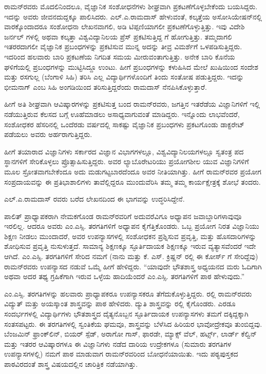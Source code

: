 ರಾಮನ್‍ರವರು ಮೊದಲಿನಿಂದಲೂ, ವೈಜ್ಞಾನಿಕ ಸಂಶೋಧನೆಗಳು ಶೀಘ್ರವಾಗಿ ಪ್ರಕಟಣೆಗೊಳ್ಳ\-ಬೇಕೆಂದು ಬಯಸಿದ್ದರು. ಇದನ್ನು ಅವರು ಜೀವನದುದ್ದಕ್ಕೂ ಪಾಲಿಸಿದರು. ಎಲ್.ಎ.ರಾಮದಾಸ್ ಹೇಳುವಂತೆ, ಕಲ್ಕತ್ತೆಯ ಅಸೋಸಿಯೇಷನ್‍ನಲ್ಲಿ ವಾರಕ್ಕೊಂದಾದರೂ ಸಂಶೋಧನಾ ಲೇಖನವಾಗಲಿ, ಅಡಿ ಟಿಪ್ಪಣಿಯಾಗಲೀ ಪ್ರಕಟಣೆಗೊಳ್ಳುತ್ತಿತ್ತು. ಇವು ವಿದೇಶಿ ಜರ್ನಲ್ ಗಳಲ್ಲಿ ಅಥವಾ ಕಲ್ಕತ್ತಾ ವಿಶ್ವವಿದ್ಯಾನಿಲಯ ಪ್ರೆಸ್ ಪ್ರಕಟಿಸುತ್ತಿದ್ದ \textit{} ಗೆ ಹೋಗುತ್ತಿತ್ತು. ತಮ್ಮದಾಗಲಿ ಇತರರದಾಗಲೀ ವೈಜ್ಞಾನಿಕ ಪ್ರಬಂಧಗಳನ್ನು ಪ್ರಕಟಿಸುವ ಮುನ್ನ ಅದನ್ನು ತೀವ್ರ ವಿಮರ್ಶೆಗೆ ಒಳಪಡಿಸುತ್ತಿದ್ದರು. ಇದರಿಂದ ಹಲವಾರು ಬಾರಿ ಪ್ರಕಟಣೆಯ ನಿಗದಿತ ಸಮಯ ಮೀರುವಂತಾಗುತ್ತಿತ್ತು. ಅನೇಕ ಬಾರಿ ಕೊನೆಯ ಘಳಿಗೆಯಲ್ಲಿ ಪ್ರಬಂಧಗಳನ್ನು ಮುಟ್ಟಿಸಿದ್ದೂ ಉಂಟು. ಹೀಗೆ ಪ್ರಬಂಧಗಳನ್ನು ಕಳುಹಿಸಿದ ಮೇಲೆ ಖುಷಿಯಿಂದ ಸಂದೇಶ ಮತ್ತು ರಸಗುಲ್ಲ (ಬೆಂಗಾಳಿ ಸಿಹಿ) ತರಿಸಿ ಎಲ್ಲ ವಿದ್ಯಾರ್ಥಿಗಳೊಂದಿಗೆ ತಿಂದು ಸಂತೋಷ ಪಡುತ್ತಿದ್ದರು. ಇದನ್ನು ಭೀಮನಾಗ್ ಎಂಬ ಸಿಹಿ ಅಂಗಡಿಯಿಂದ ತರಿಸುತ್ತಿದ್ದರೆಂದು ರಾಮದಾಸ್ ನೆನಪಿಸಿಕೊಳ್ಳುತ್ತಾರೆ.

ಹೀಗೆ ಅತಿ ಶೀಘ್ರವಾಗಿ ಆವಿಷ್ಕಾರಗಳನ್ನು ಪ್ರಕಟಿಸುತ್ತ ಬಂದ ರಾಮನ್‍ರವರು, ಜಗತ್ತಿನ ಇತರೆಡೆಯ ವಿಜ್ಞಾನಿಗಳಿಗೆ ಇಲ್ಲಿ ನಡೆಯುತ್ತಿರುವ ಕೆಲಸದ ಬಗ್ಗೆ ಊಹೆಮಾಡಲು ಅಸಾಧ್ಯವಾಗುವಂತೆ ಮಾಡಿದ್ದರು. ಇನ್ನೊಂದು ಲಾಭವೆಂದರೆ, ಸಂಶೋಧಕರ ಹೆಸರಿನಲ್ಲಿ ಒಂದೆರಡು ವರ್ಷದಲ್ಲಿ ಸಾಕಷ್ಟು ವೈಜ್ಞಾನಿಕ ಪ್ರಬಂಧಗಳು ಪ್ರಕಟಗೊಂಡು ಡಾಕ್ಟರೇಟ್ ಪಡೆಯಲು ಅವರು ಅರ್ಹರಾಗುತ್ತಿದ್ದರು.

ಹೀಗೆ ತಯಾರಾದ ವಿಜ್ಞಾನಿಗಳು ಸರ್ಕಾರದ ವಿಜ್ಞಾನ ವಿಭಾಗಗಳಲ್ಲೂ, ವಿಶ್ವವಿದ್ಯಾನಿಲಯಗಳಲ್ಲೂ ಸ್ವತಂತ್ರ ಪದ ಸ್ಥಾನಗಳಿಗೆ ಸೇರಿಕೊಳ್ಳಲು ಪ್ರೊತ್ಸಾಹಿಸುತ್ತಿದ್ದರು. ಅವರ ಲ್ಯಾಬೊರೇಟರಿಯು ಪ್ರಯೋಗಶೀಲ ಯುವ ವಿಜ್ಞಾನಿಗಳಿಗೆ ಮೂಲ ಸ್ರೋತವಾಗಬೇಕೆಂದೂ ಅದು ಮಡುಗಟ್ಟಬಾರದೆಂದೂ ಅವರ ನೀತಿಯಾಗಿತ್ತು. ಹೀಗೆ ರಾಮನ್‍ರವರ ಪ್ರಯೋಗ ಸಂಪ್ರದಾಯವನ್ನು ಈ ಪ್ರತಿಭಾಶಾಲಿಗಳು ತಾವೆಲ್ಲಿದ್ದರೂ ಮುಂದುವೆರಿಸಿ ತಮ್ಮ ತಮ್ಮ ಕಾರ್ಯಕ್ಷೇತ್ರಕ್ಕೆ ಶೋಭೆ ತಂದರು.



ಎಲ್.ಎ.ರಾಮದಾಸ್ ರವರು ಬರೆದ ಲೇಖನದಿಂದ ಈ ಭಾಗವನ್ನು ಉದ್ಧರಿಸಿದ್ದೇನೆ.

\enginline{--}ಪಾಲಿತ್ ಪ್ರಾಧ್ಯಾಪಕರಾಗಿ ನೇಮಕಗೊಂಡ ರಾಮನ್‍ರವರಿಗೆ ಅದುವರೆವಿಗೂ ಅಧ್ಯಾಪನ ಜವಾಬ್ದಾರಿಗಳಾವುವೂ ಇರಲಿಲ್ಲ. ಆದರೂ ಅವರು ಎಂ.ಎಸ್ಸಿ. ತರಗತಿಗಳಿಗೆ ಅಧ್ಯಾಪನ ಕೈಗೆತ್ತಿಕೊಂಡರು. ಒಬ್ಬ ಪ್ರಯೋಗ ನಿರತ ವಿಜ್ಞಾನಿಯು ಶಿಕ್ಷಣ ನೀಡಲು ಮುಂದಾದರೆ, ಅವರ ಉಪನ್ಯಾಸಗಳಲ್ಲಿ ಸಂಶೋಧಕನ ಪ್ರಶ್ನಿಸುವ ಪ್ರವೃತ್ತಿ, ಮತ್ತು ಹೊಸದಾರಿಗಳನ್ನು ಶೋಧಿಸುವ ಪ್ರವೃತ್ತಿ ನುಸುಳುತ್ತದೆ. ಸಾಮಾನ್ಯ ಶಿಕ್ಷಣಕ್ಕೂ ಸ್ಫೂರ್ತಿದಾಯಕ ಶಿಕ್ಷಣಕ್ಕೂ ಇರುವ ವ್ಯತ್ಯಾಸವೆಂದರೆ ಇದೇ ಆಗಿದೆ. ಎಂ.ಎಸ್ಸಿ. ತರಗತಿಗಳಿಗೆ ಸೇರಿದ ನಮಗೆ (ನಾನು ಮತ್ತು ಕೆ. ಎಸ್. ಕ್ರಿಷ್ಣನ್ ರಲ್ಲಿ ಈ ಕೋರ್ಸ್ ಗೆ ಸೇರಿದ್ದೆವು) ರಾಮನ್‍ರವರು ಉಪನ್ಯಾಸದ ನಡುವೆ ಒಮ್ಮೆ ಹೀಗೆ ಹೇಳಿದ್ದರು. “ಯಾವುದೇ ಭೌತಶಾಸ್ತ್ರ ಅಧ್ಯಯನದ ಮರು ಓದಿಗಾಗಿ ಅಥವಾ ಅದರ ತಥ್ಯ ಗ್ರಹಿಕೆಗಾಗಿ ಇರುವ ಒಳ್ಳೆಯ ಹಾದಿಯೆಂದರೆ ಎಂ.ಎಸ್ಸಿ. ತರಗತಿಗಳಿಗೆ ಪಾಠ ಹೇಳುವುದು.”

ಎಂ.ಎಸ್ಸಿ. ತರಗತಿಗಳನ್ನು ಹಲವಾರು ಪ್ರಾಧ್ಯಾಪಕರೂ ಉಪನ್ಯಾಸಕರೂ ತೆಗೆದುಕೊಳ್ಳುತ್ತಿದ್ದರು. ರಲ್ಲಿ ರಾಮನ್‍ರವರು ವಿದ್ಯುತ್ ಮತ್ತು ಅಯಸ್ಕಾಂತ ಶಾಸ್ತ್ರವನ್ನು ಪಾಠ ಹೇಳಿದರು. ದ್ಯುತಿ ಶಾಸ್ತ್ರವನ್ನು ರಲ್ಲಿ ಕೈಗೊಂಡರು. ಎರಡೂ ಸಂದರ್ಭಗಳಲ್ಲಿ ವಿದ್ಯಾರ್ಥಿಗಳು ಭೌತಶಾಸ್ತ್ರದ ದೈತ್ಯನೊಬ್ಬನ ಸ್ಫೂರ್ತಿದಾಯಕ ಉಪನ್ಯಾಸಗಳು ತಮಗೆ ದಕ್ಕಿದ್ದಕ್ಕಾಗಿ ಸಂತಸಪಟ್ಟರು. ಈ ತರಗತಿಗಳಲ್ಲಿ ಸ್ವಂತಿಕೆಯ ಘಮವೂ, ಶಾಸ್ತ್ರವನ್ನು ಬೆಳೆಸಿದ ಹಿರಿಯರ ಭಾವೋದ್ರೇಕವೂ ತುಂಬಿದ್ದವು. ಬೆಂಜಮಿನ್ ಫ್ರಾಂಕ್‌ಲಿನ್, ಬಿಯರ್ ಸ್ಪೆಡ್, ಅರಾಗೋ ಗಾಸ್, ಫಾರಡೇ, ಮ್ಯಾಕ್ಸ್ ವೆಲ್, ಹರ್ಟ್ಸ್, ಲಾರ್ಡ್ ಕೆಲ್ವಿನ್ ಮತ್ತು ಇತರರ ಆವಿಷ್ಕಾರಗಳೂ ಈ ವಿಜ್ಞಾನಿಗಳು ನಡೆದ ದಾರಿಯ ಉದ್ರೇಕಗಳೂ (ಸುಮಾರು  ತರಗತಿಗಳ ಉಪನ್ಯಾಸಗಳಲ್ಲಿ) ನಮಗೆ \textit{} ಪಾಠ ಮಾಡುವಾಗ ರಾಮನ್‍ರವರಿಂದ ಬೋಧನೆಯಾಯಿತು. ಇದು ಪಠ್ಯಪುಸ್ತಕದ ಪಾಠವಿರದಂತೆ ಶಾಸ್ತ್ರ ವಿಷಯದಲ್ಲಿನ ಚಾರಿತ್ರಿಕ ನಡೆಯಾಗಿತ್ತು.

